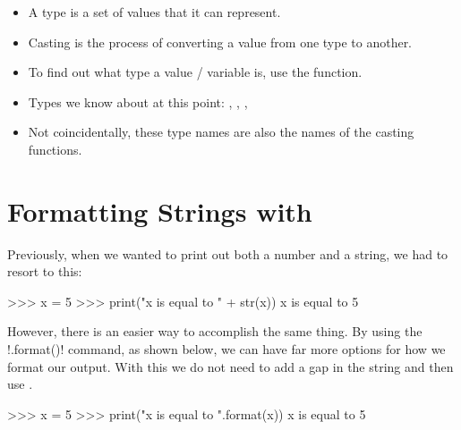 \documentclass[11pt]{cselabheader}
\begin{document}
\begin{itemize}
  \item A type is a set of values that it can represent.
  \item Casting is the process of converting a value from one type to another.
  \item To find out what type a value / variable is, use the
     function.
  \item Types we know about at this point:
        , , , 
  \item Not coincidentally, these type names are also the names of the casting
    functions.
\end{itemize}


\pagebreak
\section{Formatting Strings with \protect{}}

Previously, when we wanted to print out both a number and a string, we
had to resort to this:

\begin{pyconcode}
>>> x = 5
>>> print("x is equal to " + str(x))
x is equal to 5
\end{pyconcode}

However, there is an easier way to accomplish the same thing. By using the
\pythoninline!.format()! command, as shown below, we can have far more options for
how we format our output.
With this we do not need to add a gap in the string and then use \pythoninline{+}.

\begin{pyconcode}
>>> x = 5
>>> print("x is equal to {}".format(x))
x is equal to 5
\end{pyconcode}
\end{document}
